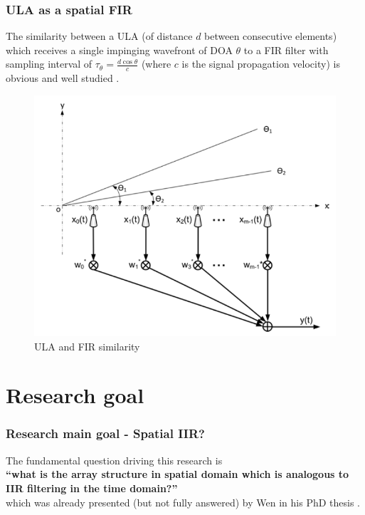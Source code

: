 \documentclass[10pt,pdflatex,headrule,landscape]{beamer}
\begin{document}
\begin{frame}
\frametitle{ULA as a spatial FIR}
\begin{minipage}{0.55\textwidth}
The similarity between a ULA (of distance $ d $ between consecutive elements) which receives a single impinging wavefront of DOA $ \theta $ to a FIR filter with sampling interval of $ \tau_{\theta}=\frac{d\cos{\theta}}{c} $ (where $ c $ is the signal propagation velocity) is obvious and well studied \cite{van1988beamforming}.
\end{minipage}
\begin{minipage}{0.44\textwidth}
\begin{figure}
\includegraphics[width=\textwidth]{Media/ULA_FIR_similarity.PNG}
\caption{ULA and FIR similarity}
\end{figure}
\end{minipage}
\end{frame}

\section{Research goal}

\begin{frame}
\frametitle{Research main goal - Spatial \textbf{IIR}?}
The fundamental question driving this research is \\
\textbf{
``what is the array structure in spatial domain which is analogous to IIR filtering in the time domain?''
}
\\
which was already presented (but not fully answered) by Wen in his PhD thesis \cite{wen2013array}.
\label{frm:ResearchMainGoal_SpatialIIR}
\end{frame}
\end{document}
